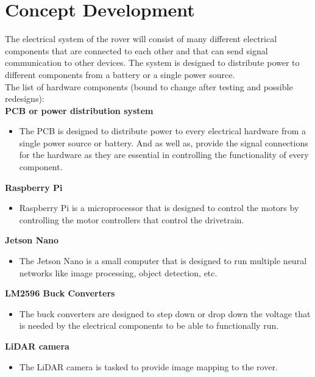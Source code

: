 \documentclass[a4paper, 10pt]{article}
\begin{document}
\pagebreak	

\section{Concept Development}
The electrical system of the rover will consist of many different electrical components that are connected to each other and that can send signal communication to other devices. The system is designed to distribute power to different components from a battery or a single power source. \\
	
The list of hardware components (bound to change after testing and possible redesigns): \\

\textbf{PCB or power distribution system}

\begin{itemize}
\item
	The PCB is designed to distribute power to every electrical hardware from a single power source or battery. And as well as, provide the signal connections for the hardware as they are essential in controlling the functionality of every component.
\end{itemize}

\textbf{Raspberry Pi}

\begin{itemize}
\item
	Raspberry Pi is a microprocessor that is designed to control the motors by controlling the motor controllers that control the drivetrain.
\end{itemize}

\textbf{Jetson Nano}

\begin{itemize}
\item
	The Jetson Nano is a small computer that is designed to run multiple neural networks like image processing, object detection, etc. 
\end{itemize}

\textbf{LM2596 Buck Converters}
\begin{itemize}
\item
	The buck converters are designed to step down or drop down the voltage that is needed by the electrical components to be able to functionally run.
\end{itemize}

\textbf{LiDAR camera}

\begin{itemize}
\item
	The LiDAR camera is tasked to provide image mapping to the rover.
\end{itemize}
\end{document}
